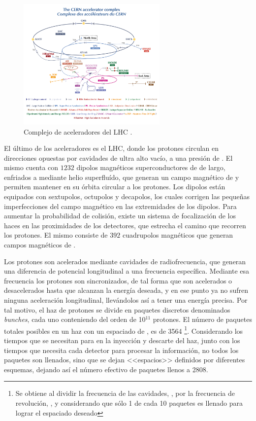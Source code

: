 \begin{figure}
  \centering
  \includegraphics[width=0.65\textwidth]{images/lhc/LHC_complex.png}
  \caption{Complejo de aceleradores del LHC \cite{Lopienska:2800984}.}
  \label{fig:LHC_complex}
\end{figure}

El último de los aceleradores es el LHC, donde los protones circulan en direcciones opuestas por cavidades de ultra alto vacío, a una presión de . El mismo cuenta con $1232$ dipolos magnéticos superconductores de  de largo, enfriados a  mediante helio superfluído, que generan un campo magnético de  y permiten mantener en su órbita circular a los protones. Los dipolos están equipados con sextupolos, octupolos y decapolos, los cuales corrigen las pequeñas imperfecciones del campo magnético en las extremidades de los dipolos. Para aumentar la probabilidad de colisión, existe un sistema de focalización de los haces en las proximidades de los detectores, que estrecha el camino que recorren los protones. El mismo consiste de $392$ cuadrupolos magnéticos que generan campos magnéticos de .

Los protones son acelerados mediante cavidades de radiofrecuencia, que generan una diferencia de potencial longitudinal a una frecuencia específica. Mediante esa frecuencia los protones son sincronizados, de tal forma que son acelerados o desacelerados hasta que alcanzan la energía deseada, y en ese punto ya no sufren ninguna aceleración longitudinal, llevándolos así a tener una energía precisa. Por tal motivo, el haz de protones se divide en paquetes discretos denominados \textit{bunches}, cada uno conteniendo del orden de 10$^{11}$ protones. El número de paquetes totales posibles en un haz con un espaciado de , es de 3564 \footnote{Se obtiene al dividir la frecuencia de las cavidades, , por la frecuencia de revolución, , y considerando que sólo 1 de cada 10 paquetes es llenado para lograr el espaciado deseado}. Considerando los tiempos que se necesitan para en la inyección y descarte del haz, junto con los tiempos que necesita cada detector para procesar la información, no todos los paquetes son llenados, sino que se dejan <<espacios>> definidos por diferentes esquemas, dejando así el número efectivo de paquetes llenos a 2808.

